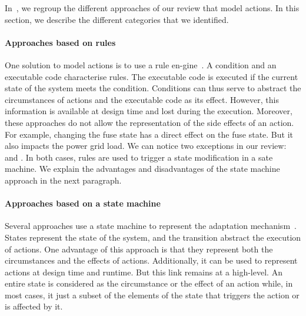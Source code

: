 In~, we regroup the different approaches of our review that model \glspl{action}.
In this section, we describe the different categories that we identified.

\paragraph{Approaches based on rules}
One solution to model \glspl{action} is to use a rule en-\linebreak gine~\cite{DBLP:conf/icse/TaharaOH17, DBLP:conf/icse/ArcainiRS15, DBLP:conf/wrla/BruniCGLV12, DBLP:conf/eurosys/GraceHPBCT08, DBLP:conf/gpce/PintoFT03, DBLP:journals/computer/GarlanCHSS04}.
A condition and an executable code characterise rules.
The executable code is executed if the current state of the system meets the condition.
Conditions can thus serve to abstract the \glspl{circumstance} of \glspl{action} and the executable code as its effect.
However, this information is available at design time and lost during the execution.
Moreover, these approaches do not allow the representation of the side effects of an action.
For example, changing the fuse state has a direct effect on the fuse state.
But it also impacts the power grid load.
We can notice two exceptions in our review: \cite{DBLP:conf/icse/TaharaOH17} and \cite{DBLP:conf/icse/ArcainiRS15}.
In both cases, rules are used to trigger a state modification in a sate machine.
We explain the advantages and disadvantages of the state machine approach in the next paragraph. 

\paragraph{Approaches based on a state machine}
Several approaches use a state machine to represent the adaptation mechanism~\cite{DBLP:conf/icse/ArcainiRS15, DBLP:conf/icse/IftikharW14a, DBLP:conf/smartgridsec/0001FKNT14, DBLP:conf/sigsoft/MorenoCGS15, DBLP:conf/kbse/FilieriGLM11, DBLP:conf/wetice/DjoudiBZ14, DBLP:conf/aosd/ZhangGC09, DBLP:conf/icse/GhezziPST13, DBLP:conf/kbse/TajalliGEM10}.
States represent the state of the system, and the transition abstract the execution of \glspl{action}. 
One advantage of this approach is that they represent both the \glspl{circumstance} and the effects of actions.
Additionally, it can be used to represent actions at design time and runtime.
But this link remains at a high-level.
An entire state is considered as the circumstance or the effect of an action while, in most cases, it just a subset of the elements of the state that triggers the action or is affected by it. 

